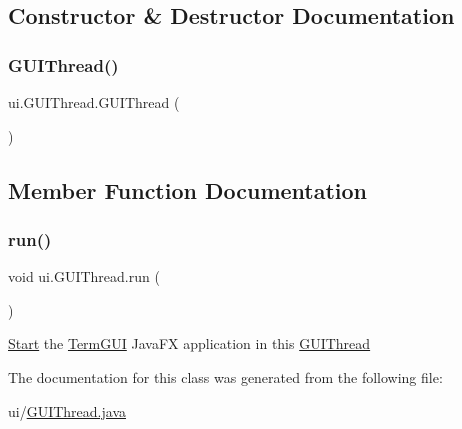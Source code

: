 \subsection{Constructor \& Destructor Documentation}
\mbox{\label{classui_1_1_g_u_i_thread_a5d4ae813e8a2dff1330af0c2c7dc3ca1}} 
\subsubsection{\texorpdfstring{G\+U\+I\+Thread()}{GUIThread()}}
{\footnotesize\ttfamily ui.\+G\+U\+I\+Thread.\+G\+U\+I\+Thread (\begin{DoxyParamCaption}{ }\end{DoxyParamCaption})\hspace{0.3cm}{\ttfamily [inline]}}



\subsection{Member Function Documentation}
\mbox{\label{classui_1_1_g_u_i_thread_a5e9e3c77bbddb0b00ba03b87939f0ee2}} 
\subsubsection{\texorpdfstring{run()}{run()}}
{\footnotesize\ttfamily void ui.\+G\+U\+I\+Thread.\+run (\begin{DoxyParamCaption}{ }\end{DoxyParamCaption})\hspace{0.3cm}{\ttfamily [inline]}}

\mbox{\hyperlink{class_start}{Start}} the \mbox{\hyperlink{classui_1_1_term_g_u_i}{Term\+G\+UI}} Java\+FX application in this \mbox{\hyperlink{classui_1_1_g_u_i_thread}{G\+U\+I\+Thread}} 

The documentation for this class was generated from the following file\+:\begin{DoxyCompactItemize}
\item 
ui/\mbox{\hyperlink{_g_u_i_thread_8java}{G\+U\+I\+Thread.\+java}}\end{DoxyCompactItemize}
